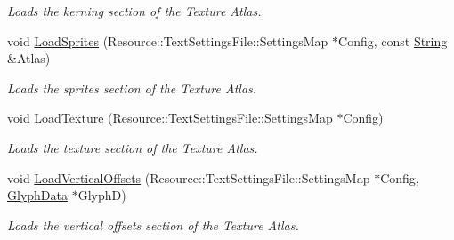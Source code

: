 \begin{DoxyCompactItemize}
\begin{DoxyCompactList}\small\item\em Loads the kerning section of the Texture Atlas. \item\end{DoxyCompactList}\item 
\hypertarget{classMezzanine_1_1UI_1_1TextureAtlas_ae509c276dd7b314d23415131c7ebae76}{
void \hyperlink{classMezzanine_1_1UI_1_1TextureAtlas_ae509c276dd7b314d23415131c7ebae76}{LoadSprites} (Resource::TextSettingsFile::SettingsMap $\ast$Config, const \hyperlink{namespaceMezzanine_acf9fcc130e6ebf08e3d8491aebcf1c86}{String} \&Atlas)}
\label{classMezzanine_1_1UI_1_1TextureAtlas_ae509c276dd7b314d23415131c7ebae76}

\begin{DoxyCompactList}\small\item\em Loads the sprites section of the Texture Atlas. \item\end{DoxyCompactList}\item 
\hypertarget{classMezzanine_1_1UI_1_1TextureAtlas_ad1de4ca0e0bb8b9893b98a42ff1b8e92}{
void \hyperlink{classMezzanine_1_1UI_1_1TextureAtlas_ad1de4ca0e0bb8b9893b98a42ff1b8e92}{LoadTexture} (Resource::TextSettingsFile::SettingsMap $\ast$Config)}
\label{classMezzanine_1_1UI_1_1TextureAtlas_ad1de4ca0e0bb8b9893b98a42ff1b8e92}

\begin{DoxyCompactList}\small\item\em Loads the texture section of the Texture Atlas. \item\end{DoxyCompactList}\item 
\hypertarget{classMezzanine_1_1UI_1_1TextureAtlas_abb48994c9dc9b9ba04f573342dea8e2b}{
void \hyperlink{classMezzanine_1_1UI_1_1TextureAtlas_abb48994c9dc9b9ba04f573342dea8e2b}{LoadVerticalOffsets} (Resource::TextSettingsFile::SettingsMap $\ast$Config, \hyperlink{classMezzanine_1_1UI_1_1GlyphData}{GlyphData} $\ast$GlyphD)}
\label{classMezzanine_1_1UI_1_1TextureAtlas_abb48994c9dc9b9ba04f573342dea8e2b}

\begin{DoxyCompactList}\small\item\em Loads the vertical offsets section of the Texture Atlas. \item\end{DoxyCompactList}\end{DoxyCompactItemize}
